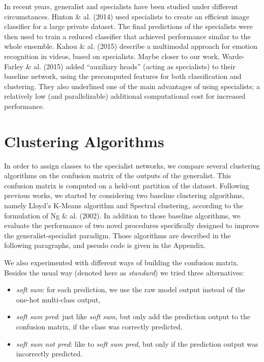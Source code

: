 \documentclass[12pt]{article}
\begin{document}
In recent years, generalist and specialists have been studied under
different circumstances. Hinton \& al. (2014) used specialists to create
an efficient image classifier for a large private dataset. The final
predictions of the specialists were then used to train a reduced
classifier that achieved performance similar to the whole ensemble.
Kahou \& al. (2015) describe a multimodal approach for emotion
recognition in videos, based on specialists. Maybe closer to our work,
Warde-Farley \& al. (2015) added ``auxiliary heads'' (acting as
specialists) to their baseline network, using the precomputed features
for both classification and clustering. They also underlined one of the
main advantages of using specialists; a relatively low (and
parallelizable) additional computational cost for increased performance.

\section{Clustering Algorithms}\label{clustering-algorithms}

In order to assign classes to the specialist networks, we compare
several clustering algorithms on the confusion matrix of the outputs of
the generalist. This confusion matrix is computed on a held-out
partition of the dataset. Following previous works, we started by
considering two baseline clustering algorithms, namely Lloyd's K-Means
algorithm and Spectral clustering, according to the formulation of Ng \&
al. (2002). In addition to those baseline algorithms, we evaluate the
performance of two novel procedures specifically designed to improve the
generalist-specialist paradigm. Those algorithms are described in the
following paragraphs, and pseudo code is given in the Appendix.

We also experimented with different ways of building the confusion
matrix. Besides the usual way (denoted here as \emph{standard}) we tried
three alternatives:

\begin{itemize}
\itemsep1pt\parskip0pt
\item
  \emph{soft sum}: for each prediction, we use the raw model output
  instead of the one-hot multi-class output,
\item
  \emph{soft sum pred}: just like \emph{soft sum}, but only add the
  prediction output to the confusion matrix, if the class was correctly
  predicted,
\item
  \emph{soft sum not pred}: like to \emph{soft sum pred}, but only if
  the prediction output was incorrectly predicted.
\end{itemize}
\end{document}
